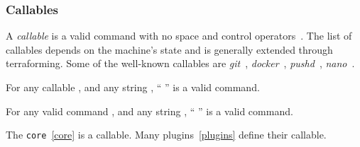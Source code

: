\subsubsection{Callables}
\label{callables}

A \emph{callable} is a valid command with no space and control operators~. The list of callables depends on the machine's state and is generally extended through terraforming. Some of the well-known callables are \emph{git}~, \emph{docker}~, \emph{pushd}~, \emph{nano}~. 

\begin{theorem}
For any callable , and any string , `` '' is a valid command.
\end{theorem}

\begin{theorem}
For any valid command , and any string , `` '' is a valid command.
\end{theorem}

The \texttt{core}~\ref{core} is a callable. Many plugins~\ref{plugins} define their callable. 